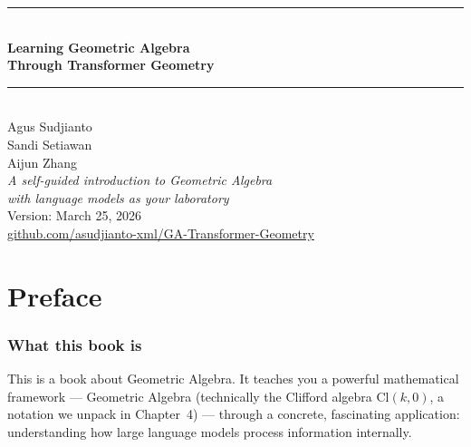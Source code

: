 \documentclass[11pt, twoside, openright]{memoir}
\begin{document}

\frontmatter
\pagestyle{empty}


\begin{titlingpage}
\vspace*{1.5cm}
\begin{center}
  {\color{Navy}\rule{\linewidth}{2pt}}\\[12pt]
  {\Huge\bfseries\sffamily\color{Navy} Learning Geometric Algebra}\\[10pt]
  {\LARGE\bfseries\sffamily\color{Navy} Through Transformer Geometry}\\[10pt]
  {\color{Navy}\rule{\linewidth}{1.5pt}}\\[20pt]
  {\large\sffamily\color{DGray} Agus Sudjianto}\\[16pt]
  {\large\sffamily\color{DGray} Sandi Setiawan}\\[16pt]
  {\large\sffamily\color{DGray} Aijun Zhang}\\[40pt]
  {\normalsize\itshape\color{DGray}
   A self-guided introduction to Geometric Algebra\\
   with language models as your laboratory}\\[30pt]
  {\small\sffamily\color{DGray} Version: March 25, 2026}\\[20pt]
  {\small\sffamily\color{Blue}
   \href{https://github.com/asudjianto-xml/GA-Transformer-Geometry}%
   {github.com/asudjianto-xml/GA-Transformer-Geometry}}
\end{center}
\end{titlingpage}
\clearpage

\chapter*{Preface}

\subsection*{What this book is}

This is a book about Geometric Algebra.  It teaches you a powerful
mathematical framework --- Geometric Algebra (technically the Clifford algebra $\mathrm{Cl}(k,0)$, a notation we unpack in Chapter~4) ---
through a concrete, fascinating application: understanding how large
language models process information internally.
\end{document}
